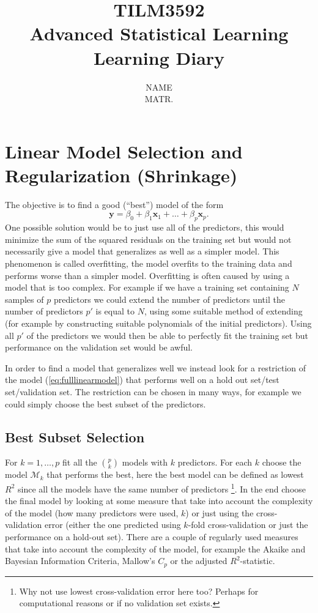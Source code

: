 \documentclass[a4paper, 12pt]{scrartcl}
\title{{\Large \textbf{TILM3592\\Advanced Statistical Learning}}\\{\LARGE \bfseries Learning Diary}}
\author{{\large NAME}\\
{ MATR.}}
\date{}
\begin{document}
\maketitle


\section{Linear Model Selection and Regularization (Shrinkage)}

The objective is to find a good (``best'') model of the form
\begin{equation}\label{eq:fulllinearmodel}
	\mathbf{y}=\beta_0+\beta_1\mathbf{x}_1+\ldots+\beta_p\mathbf{x}_p.
\end{equation}
One possible solution would be to just use all of the predictors, this would minimize the sum of the squared residuals on the training set but would not necessarily give a model that generalizes as well as a simpler model. This phenomenon is called overfitting, the model overfits to the training data and performs worse than a simpler model. Overfitting is often caused by using a model that is too complex. For example if we have a training set containing $N$ samples of $p$ predictors we could extend the number of predictors until the number of predictors $p'$ is equal to $N$, using some suitable method of extending (for example by constructing suitable polynomials of the initial predictors). Using all $p'$ of the predictors we would then be able to perfectly fit the training set but performance on the validation set would be awful.

In order to find a model that generalizes well we instead look for a restriction of the model (\ref{eq:fulllinearmodel}) that performs well on a hold out set/test set/validation set. The restriction can be chosen in many ways, for example we could simply choose the best subset of the predictors.

\subsection{Best Subset Selection}
For $k=1,\ldots,p$ fit all the ${p \choose k}$ models with $k$ predictors. For each $k$ choose the model $\mathcal{M}_k$ that performs the best, here the best model can be defined as lowest $R^2$ since all the models have the same number of predictors \footnote{Why not use lowest cross-validation error here too? Perhaps for computational reasons or if no validation set exists.}. In the end choose the final model by looking at some measure that take into account the complexity of the model (how many predictors were used, $k$) or just using the cross-validation error (either the one predicted using $k$-fold cross-validation or just the performance on a hold-out set). There are a couple of regularly used measures that take into account the complexity of the model, for example the Akaike and Bayesian Information Criteria, Mallow's $C_p$ or the adjusted $R^2$-statistic.
\end{document}
